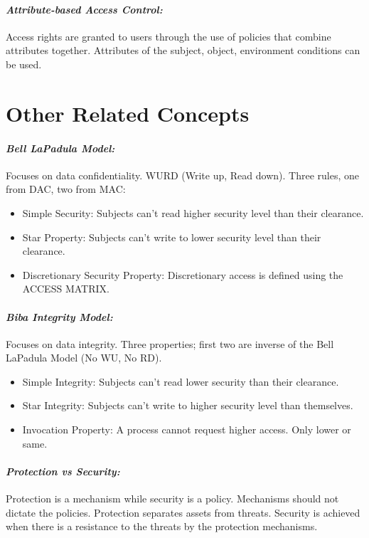 \documentclass[11pt]{article} %
\begin{document}
\paragraph{\textit{Attribute-based Access Control:}} Access rights are granted to users through the use of policies that combine attributes together.
Attributes of the subject, object, environment conditions can be used.

\section{Other Related Concepts}

\paragraph{\textit{Bell LaPadula Model:}} Focuses on data confidentiality.
WURD (Write up, Read down).
Three rules, one from DAC, two from MAC:

\begin{itemize}
\item Simple Security: Subjects can't read higher security level than their clearance.
\item Star Property: Subjects can't write to lower security level than their clearance.
\item Discretionary Security Property: Discretionary access is defined using the ACCESS MATRIX.
\end{itemize}

\paragraph{\textit{Biba Integrity Model:}} Focuses on data integrity.
Three properties; first two are inverse of the Bell LaPadula Model (No WU, No RD).

\begin{itemize}
\item Simple Integrity: Subjects can't read lower security than their clearance.
\item Star Integrity: Subjects can't write to higher security level than themselves.
\item Invocation Property: A process cannot request higher access. Only lower or same.
\end{itemize}

\paragraph{\textit{Protection vs Security:}} Protection is a mechanism while security is a policy.
Mechanisms should not dictate the policies.
Protection separates assets from threats.
Security is achieved when there is a resistance to the threats by the protection mechanisms.
\end{document}
